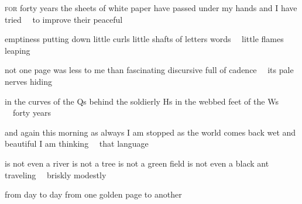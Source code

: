 
\begin{poem}
\begin{stanza}
\textsc{for} forty years\verseline
the sheets of white paper have\verseline
passed under my hands and I have tried\verseline
~~to improve their peaceful
\end{stanza}

\begin{stanza}
emptiness putting down\verseline
little curls little shafts\verseline
of letters words\verseline
~~little flames leaping
\end{stanza}

\begin{stanza}
not one page\verseline
was less to me than fascinating\verseline
discursive full of cadence\verseline
~~its pale nerves hiding
\end{stanza}

\begin{stanza}
in the curves of the Qs\verseline
behind the soldierly Hs\verseline
in the webbed feet of the Ws\verseline
~~forty years
\end{stanza}

\begin{stanza}
and again this morning as always\verseline
I am stopped as the world comes back\verseline
wet and beautiful I am thinking\verseline
~~that language
\end{stanza}

\begin{stanza}
is not even a river\verseline
is not a tree is not a green field\verseline
is not even a black ant traveling\verseline
~~briskly modestly
\end{stanza}

\begin{stanza}
from day to day from one\verseline
golden page to another
\end{stanza}
\end{poem}